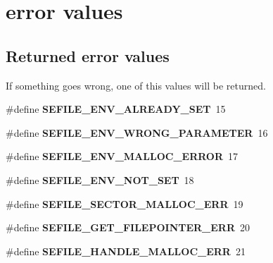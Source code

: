 \hypertarget{group__error_values}{\section{error values}
\label{group__error_values}
}
\subsection*{Returned error values}
\label{_amgrp230f53f95503d7f79a01c11bfde45a81}%
If something goes wrong, one of this values will be returned. \begin{DoxyCompactItemize}
\item 
\hypertarget{group__error_values_gaef0379bf0ad20b2772c25501047a7d4a}{\#define {\bfseries S\-E\-F\-I\-L\-E\-\_\-\-E\-N\-V\-\_\-\-A\-L\-R\-E\-A\-D\-Y\-\_\-\-S\-E\-T}~15}\label{group__error_values_gaef0379bf0ad20b2772c25501047a7d4a}

\item 
\hypertarget{group__error_values_ga53869d0f6f2c9fbfbcb7aa6bf1fb4442}{\#define {\bfseries S\-E\-F\-I\-L\-E\-\_\-\-E\-N\-V\-\_\-\-W\-R\-O\-N\-G\-\_\-\-P\-A\-R\-A\-M\-E\-T\-E\-R}~16}\label{group__error_values_ga53869d0f6f2c9fbfbcb7aa6bf1fb4442}

\item 
\hypertarget{group__error_values_gad12c7a1466b671f490ae39ce0713bc78}{\#define {\bfseries S\-E\-F\-I\-L\-E\-\_\-\-E\-N\-V\-\_\-\-M\-A\-L\-L\-O\-C\-\_\-\-E\-R\-R\-O\-R}~17}\label{group__error_values_gad12c7a1466b671f490ae39ce0713bc78}

\item 
\hypertarget{group__error_values_gafddfc71142aed0903f4d1ea923216b7e}{\#define {\bfseries S\-E\-F\-I\-L\-E\-\_\-\-E\-N\-V\-\_\-\-N\-O\-T\-\_\-\-S\-E\-T}~18}\label{group__error_values_gafddfc71142aed0903f4d1ea923216b7e}

\item 
\hypertarget{group__error_values_ga1e1aabadb5130519c51d950ac93d1826}{\#define {\bfseries S\-E\-F\-I\-L\-E\-\_\-\-S\-E\-C\-T\-O\-R\-\_\-\-M\-A\-L\-L\-O\-C\-\_\-\-E\-R\-R}~19}\label{group__error_values_ga1e1aabadb5130519c51d950ac93d1826}

\item 
\hypertarget{group__error_values_ga37c8b9e2086b758d7e5a883de0d41d02}{\#define {\bfseries S\-E\-F\-I\-L\-E\-\_\-\-G\-E\-T\-\_\-\-F\-I\-L\-E\-P\-O\-I\-N\-T\-E\-R\-\_\-\-E\-R\-R}~20}\label{group__error_values_ga37c8b9e2086b758d7e5a883de0d41d02}

\item 
\hypertarget{group__error_values_ga75d2ef63f37fbd2c5a3489f03e20e7a9}{\#define {\bfseries S\-E\-F\-I\-L\-E\-\_\-\-H\-A\-N\-D\-L\-E\-\_\-\-M\-A\-L\-L\-O\-C\-\_\-\-E\-R\-R}~21}\label{group__error_values_ga75d2ef63f37fbd2c5a3489f03e20e7a9}


\end{DoxyCompactItemize}
